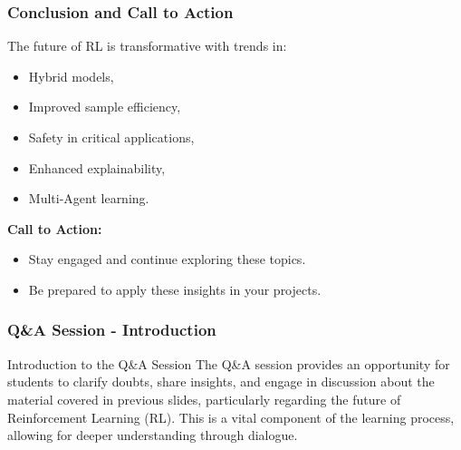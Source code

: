 \documentclass[aspectratio=169]{beamer}
\begin{document}
\begin{frame}[fragile]
    \frametitle{Conclusion and Call to Action}
    The future of RL is transformative with trends in:
    \begin{itemize}
        \item Hybrid models, 
        \item Improved sample efficiency,
        \item Safety in critical applications,
        \item Enhanced explainability,
        \item Multi-Agent learning.
    \end{itemize}
    \textbf{Call to Action:} 
    \begin{itemize}
        \item Stay engaged and continue exploring these topics.
        \item Be prepared to apply these insights in your projects.
    \end{itemize}
\end{frame}

\begin{frame}[fragile]
    \frametitle{Q\&A Session - Introduction}
    \begin{block}{Introduction to the Q\&A Session}
        The Q\&A session provides an opportunity for students to clarify doubts, share insights, 
        and engage in discussion about the material covered in previous slides, particularly 
        regarding the future of Reinforcement Learning (RL). This is a vital component of the 
        learning process, allowing for deeper understanding through dialogue.
    \end{block}
\end{frame}
\end{document}
